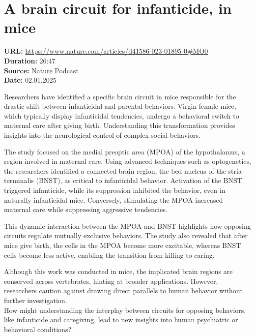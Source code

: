 \documentclass[12pt]{article}
\begin{document}
\section{A brain circuit for infanticide, in mice}
\textbf{URL:} \url{https://www.nature.com/articles/d41586-023-01895-0#MO0}\\
\textbf{Duration:} 26:47\\
\textbf{Source:} Nature Podcast\\
\textbf{Date:} 02.01.2025



Researchers have identified a specific brain circuit in mice responsible for the drastic shift between infanticidal and parental behaviors. Virgin female mice, which typically display infanticidal tendencies, undergo a behavioral switch to maternal care after giving birth. Understanding this transformation provides insights into the neurological control of complex social behaviors.  

The study focused on the medial preoptic area (MPOA) of the hypothalamus, a region involved in maternal care. Using advanced techniques such as optogenetics, the researchers identified a connected brain region, the bed nucleus of the stria terminalis (BNST), as critical to infanticidal behavior. Activation of the BNST triggered infanticide, while its suppression inhibited the behavior, even in naturally infanticidal mice. Conversely, stimulating the MPOA increased maternal care while suppressing aggressive tendencies.  

This dynamic interaction between the MPOA and BNST highlights how opposing circuits regulate mutually exclusive behaviors. The study also revealed that after mice give birth, the cells in the MPOA become more excitable, whereas BNST cells become less active, enabling the transition from killing to caring.  

Although this work was conducted in mice, the implicated brain regions are conserved across vertebrates, hinting at broader applications. However, researchers caution against drawing direct parallels to human behavior without further investigation.\\[5px]  

How might understanding the interplay between circuits for opposing behaviors, like infanticide and caregiving, lead to new insights into human psychiatric or behavioral conditions? 


\newpage



\end{document}
